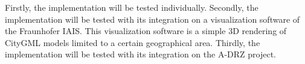         Firstly, the implementation will be tested individually.
        Secondly, the implementation will be tested with its integration on a visualization software of the Fraunhofer IAIS.
        This visualization software is a simple 3D rendering of CityGML models limited to a certain geographical area.
        Thirdly, the implementation will be tested with its integration on the A-DRZ project.



